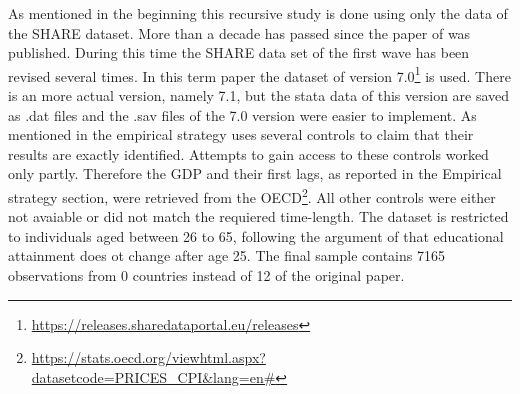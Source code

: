 \documentclass[12pt,a4paper]{article}
\let\rmarkdownfootnote\footnote%
\def\footnote{\protect\rmarkdownfootnote}
\begin{document}
As mentioned in the beginning this recursive study is done using only
the data of the SHARE dataset. More than a decade has passed since the
paper of \textcite{brunello} was published. During this time the SHARE
data set of the first wave has been revised several times. In this term
paper the dataset of version 7.0\footnote{\url{https://releases.sharedataportal.eu/releases}}
is used. There is an more actual version, namely 7.1, but the stata data
of this version are saved as .dat files and the .sav files of the 7.0
version were easier to implement. As mentioned in the empirical strategy
\textcite{brunello} uses several controls to claim that their results
are exactly identified. Attempts to gain access to these controls worked
only partly. Therefore the GDP and their first lags, as reported in the
Empirical strategy section, were retrieved from the OECD\footnote{\url{https://stats.oecd.org/viewhtml.aspx?datasetcode=PRICES_CPI\&lang=en\#}}.
All other controls were either not avaiable or did not match the
requiered time-length. The dataset is restricted to individuals aged
between 26 to 65, following the argument of \textcite{brunello} that
educational attainment does ot change after age 25. The final sample
contains 7165 observations from 0 countries instead of 12 of the
original paper.

\newcommand{\range}[1]{\eqparbox{ra}{#1}}
\end{document}
